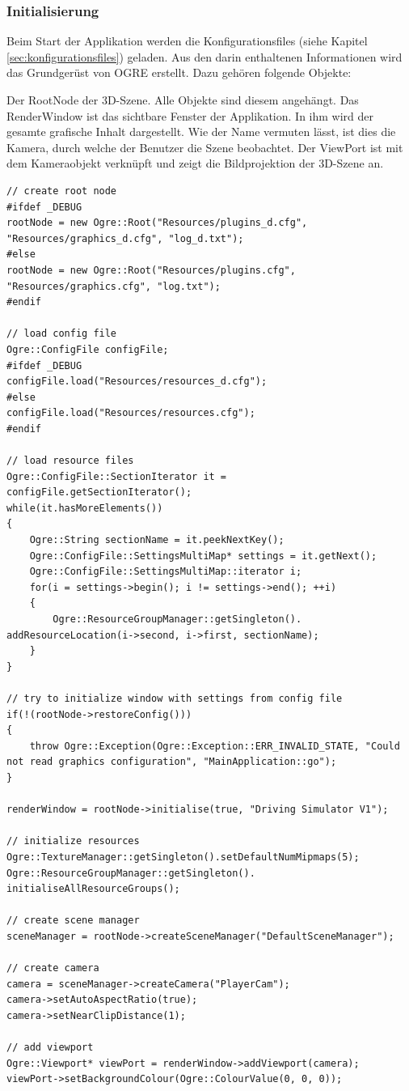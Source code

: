 
\subsubsection{Initialisierung}

Beim Start der Applikation werden die Konfigurationsfiles (siehe Kapitel \ref{sec:konfigurationsfiles}) geladen. Aus den darin enthaltenen Informationen wird das Grundgerüst von OGRE erstellt. Dazu gehören folgende Objekte:

Der RootNode der 3D-Szene. Alle Objekte sind diesem angehängt.
Das RenderWindow ist das sichtbare Fenster der Applikation. In ihm wird der gesamte grafische Inhalt dargestellt.
Wie der Name vermuten lässt, ist dies die Kamera, durch welche der Benutzer die Szene beobachtet.
Der ViewPort ist mit dem Kameraobjekt verknüpft und zeigt die Bildprojektion der 3D-Szene an. 

\begin{lstlisting}[caption={Laden der Konfigurationsdateien},label={laden_konfigurationsdateien}]
// create root node
#ifdef _DEBUG
rootNode = new Ogre::Root("Resources/plugins_d.cfg", "Resources/graphics_d.cfg", "log_d.txt");
#else
rootNode = new Ogre::Root("Resources/plugins.cfg", "Resources/graphics.cfg", "log.txt");
#endif

// load config file
Ogre::ConfigFile configFile;
#ifdef _DEBUG
configFile.load("Resources/resources_d.cfg");
#else
configFile.load("Resources/resources.cfg");
#endif

// load resource files
Ogre::ConfigFile::SectionIterator it = configFile.getSectionIterator();
while(it.hasMoreElements())
{
	Ogre::String sectionName = it.peekNextKey();
	Ogre::ConfigFile::SettingsMultiMap* settings = it.getNext();
	Ogre::ConfigFile::SettingsMultiMap::iterator i;
	for(i = settings->begin(); i != settings->end(); ++i)
	{
		Ogre::ResourceGroupManager::getSingleton(). addResourceLocation(i->second, i->first, sectionName);
	}
}

// try to initialize window with settings from config file
if(!(rootNode->restoreConfig()))
{
	throw Ogre::Exception(Ogre::Exception::ERR_INVALID_STATE, "Could not read graphics configuration", "MainApplication::go");
}

renderWindow = rootNode->initialise(true, "Driving Simulator V1");

// initialize resources
Ogre::TextureManager::getSingleton().setDefaultNumMipmaps(5);
Ogre::ResourceGroupManager::getSingleton(). initialiseAllResourceGroups();

// create scene manager
sceneManager = rootNode->createSceneManager("DefaultSceneManager");

// create camera
camera = sceneManager->createCamera("PlayerCam");
camera->setAutoAspectRatio(true);
camera->setNearClipDistance(1);

// add viewport
Ogre::Viewport* viewPort = renderWindow->addViewport(camera);
viewPort->setBackgroundColour(Ogre::ColourValue(0, 0, 0));
\end{lstlisting}

